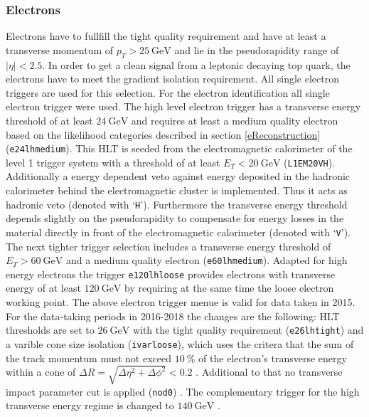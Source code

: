 \subsubsection*{Electrons}
Electrons have to fullfill the tight quality requirement and have at least a transverse momentum of $p_T>\SI{25}{\giga\electronvolt}$ and lie in the pseudorapidity range of $|\eta|<2.5$. In order to get a clean signal from a leptonic decaying top quark, the electrons have to meet the gradient isolation requirement. All single electron triggers are used for this selection.\newline
For the electron identification all single electron trigger were used. The high level electron trigger has a transverse energy threshold of at least $\SI{24}{\giga\electronvolt}$ and requires at least a medium quality electron based on the likelihood categories described in section \ref{eReconstruction} (\texttt{e24\textunderscore lhmedium}). This HLT is seeded from the electromagnetic calorimeter of the level 1 trigger system with a threshold of at least $E_T<\SI{20}{\giga\electronvolt}$ (\texttt{L1EM20VH}). Additionally a energy dependent veto against energy deposited in the hadronic calorimeter behind  the electromagnetic cluster is implemented. Thus it acts as hadronic veto (denoted with `\texttt{H}'). Furthermore the transverse energy threshold depends slightly on the pseudorapidity to compensate for energy losses in the material directly in front of the electromagnetic calorimeter (denoted with `\texttt{V}'). The next tighter trigger selection includes a transverse energy threshold of $E_T>\SI{60}{\giga\electronvolt}$ and a medium quality electron (\texttt{e60\textunderscore lhmedium}). Adapted for high energy electrons the trigger \texttt{e120\textunderscore lhloose} provides electrons with transverse energy of at least $\SI{120}{\giga\electronvolt}$ by requiring at the same time the loose electron working point. \cite{trigger:e:mu} The above electron trigger menue is valid for data taken in 2015. For the data-taking periods in 2016-2018 the changes are the following:\newline
HLT thresholds are set to $\SI{26}{\giga\electronvolt}$ with the tight quality requirement (\texttt{e26\textunderscore lhtight}) and a varible cone size isolation (\texttt{ivarloose}), which uses the critera that the sum of the track momentum must not exceed $\SI{10}{\percent}$ of the electron's transverse energy within a cone of $\Delta R=\sqrt{\Delta\eta^2+\Delta\phi^2}<0.2$ \cite{trigger:ivarloose:erkl}\cite{trigger:ivarloose:form}. Additional to that no transverse impact parameter cut is applied (\texttt{nod0}) \cite{trigger:ivarloose:erkl}. The complementary trigger for the high transverse energy regime is changed to $\SI{140}{\giga\electronvolt}$ \cite{trigger:e:mu}.
